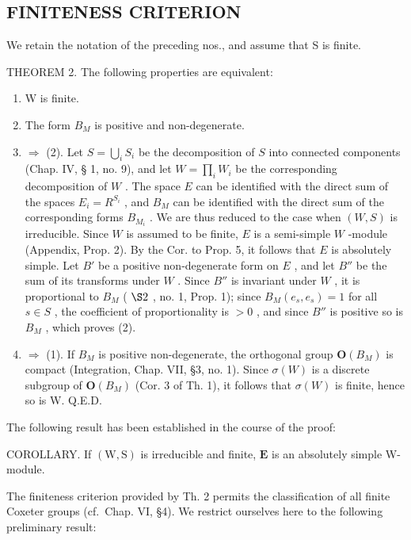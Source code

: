 \subsection{FINITENESS CRITERION}

We retain the notation of the preceding nos., and assume that S is finite.

THEOREM 2. The following properties are equivalent:

\begin{enumerate}
\def\labelenumi{(\arabic{enumi})}
\item
  W is finite.
\item
  The form \(B_{M}\) is positive and non-degenerate.
\item
  \(\Longrightarrow\) (2). Let \(S = \bigcup_{i} S_{i}\) be the decomposition of \(S\) into connected components (Chap. IV, § 1, no. 9), and let \(W = \prod_{i} W_{i}\) be the corresponding decomposition of \(W\) . The space \(E\) can be identified with the direct sum of the spaces \(E_{i} = R^{S_{i}}\) , and \(B_{M}\) can be identified with the direct sum of the corresponding forms \(B_{M_{i}}\) . We are thus reduced to the case when \((W, S)\) is irreducible. Since \(W\) is assumed to be finite, \(E\) is a semi-simple \(W\) -module (Appendix, Prop. 2). By the Cor. to Prop. 5, it follows that \(E\) is absolutely simple. Let \(B'\) be a positive non-degenerate form on \(E\) , and let \(B''\) be the sum of its transforms under \(W\) . Since \(B''\) is invariant under \(W\) , it is proportional to \(B_{M}\) ( \(\S 2\) , no. 1, Prop. 1); since \(B_{M}(e_{s}, e_{s}) = 1\) for all \(s \in S\) , the coefficient of proportionality is \(>0\) , and since \(B''\) is positive so is \(B_{M}\) , which proves (2).
\item
  \(\Longrightarrow\) (1). If \(B_{M}\) is positive non-degenerate, the orthogonal group \(\mathbf{O}(B_{M})\) is compact (Integration, Chap. VII, §3, no. 1). Since \(\sigma(W)\) is a discrete subgroup of \(\mathbf{O}(B_{M})\) (Cor. 3 of Th. 1), it follows that \(\sigma(W)\) is finite, hence so is W. Q.E.D.
\end{enumerate}

The following result has been established in the course of the proof:

COROLLARY. If \((\mathrm{W},\mathrm{S})\) is irreducible and finite, \(\mathbf{E}\) is an absolutely simple W-module.

The finiteness criterion provided by Th. 2 permits the classification of all finite Coxeter groups (cf.~Chap. VI, §4). We restrict ourselves here to the following preliminary result:

